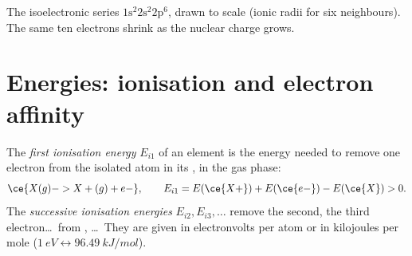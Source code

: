 \begin{omfigure}

{\small The isoelectronic series $1\text{s}^2 2\text{s}^2 2\text{p}^6$,
drawn to scale (ionic radii for six neighbours). The same ten electrons
shrink as the nuclear charge grows.}
\end{omfigure}

\section{Energies: ionisation and electron affinity}

\begin{definition}\label{def:b1:periodicity:ionisation-energy}
The \emph{first ionisation energy} $E_{i1}$
of an element is the energy needed to remove one electron from the
isolated atom in its , in the gas phase:
\[
  \ce{X(g) -> X+(g) + e-}, \qquad E_{i1} = E(\ce{X+}) + E(\ce{e-}) - E(\ce{X}) > 0 .
\]
The \emph{successive ionisation energies}
$E_{i2}, E_{i3}, \dots$ remove the second, the third
electron\dots\ from , \dots\ They are given in
electronvolts per atom or in kilojoules per mole
($\qty{1}{eV} \leftrightarrow \qty{96.49}{kJ/mol}$).
\end{definition}

